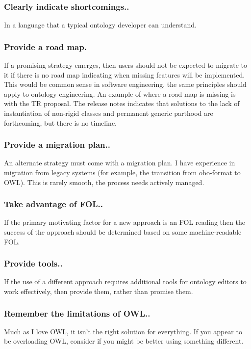 \documentclass{bioinfo}
\begin{document}
\subsubsection{Clearly indicate shortcomings..} In a language that a
typical ontology developer can understand.

\subsubsection{Provide a road map.} If a promising strategy emerges,
then users should not be expected to migrate to it if there is no road
map indicating when missing features will be implemented. This would
be common sense in software engineering, the same principles should
apply to ontology engineering.  An example of where a road map is
missing is with the TR proposal. The release notes indicates that
solutions to the lack of instantiation of non-rigid classes and
permanent generic parthood are forthcoming, but there is no timeline.

\subsubsection{Provide a migration plan..} An alternate strategy must
come with a migration plan. I have experience in migration from legacy
systems (for example, the transition from obo-format to OWL). This is
rarely smooth, the process needs actively managed.

\subsubsection{Take advantage of FOL..} If the primary motivating
factor for a new approach is an FOL reading then the success of the
approach should be determined based on some machine-readable FOL.

\subsubsection{Provide tools..} If the use of a different approach
requires additional tools for ontology editors to work effectively,
then provide them, rather than promise them.

\subsubsection{Remember the limitations of OWL..} Much as I love OWL,
it isn't the right solution for everything. If you appear to be
overloading OWL, consider if you might be better using something
different.
\end{document}
